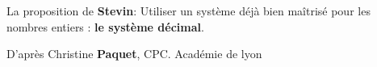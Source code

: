 \begin{His}
\vspace{0.2cm}

La proposition de \textbf{Stevin}: Utiliser un système déjà bien maîtrisé pour les nombres entiers : \textbf{le système décimal}.

\vspace{0.2cm}


\hfill{D'après Christine \textbf{Paquet}, CPC. Académie de lyon}
\end{His}

